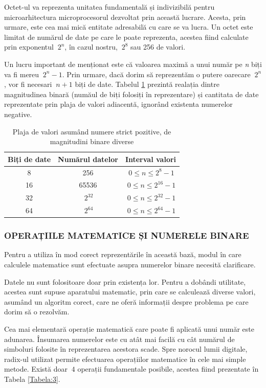 \documentclass[12pt]{article}
\begin{document}
Octet-ul va reprezenta unitatea fundamentală și indivizibilă pentru microarhitectura microprocesorul dezvoltat prin această lucrare. Acesta, prin urmare, este cea mai mică entitate adresabilă cu care se va lucra. Un octet este limitat de numărul de date pe care le poate reprezenta, acestea fiind calculate prin exponentul $\ 2^n$, în cazul nostru, $\ 2^8$ sau 256 de valori.

Un lucru important de menționat este că valoarea maximă a unui număr pe \textit{n} biți va fi mereu $\ 2^n -1$. Prin urmare, dacă dorim să reprezentăm o putere oarecare $\ 2^n$, vor fi necesari $\ n +1$ biți de date.
Tabelul \ref{Tabela:2} prezintă realația dintre magnitudinea binară (număul de biți folosiți în reprezentare) și cantitata de date reprezentate prin plaja de valori adiacentă, ignorând existenta numerelor negative.

\begin{table}[h]
\centering
\caption{Plaja de valori asumând numere strict pozitive, de magnitudini binare diverse }
\label{Tabela:2}
\begin{tabular}{ ||c|c|c|| }
 \hline
 Biți de date & Numărul datelor & Interval valori \\ 
 \hline  \hline
 8 & 256 & $\ 0 \le n \le 2^{8} - 1$ \\
 \hline
 16 & 65536 & $\ 0 \le n \le 2^{16} - 1$ \\
 \hline
 32 &  $\ 2^{32}$ & $\ 0 \le n \le 2^{32} - 1$ \\
 \hline
 64 & $\ 2^{64}$ & $\ 0 \le n \le 2^{64} -1$ \\
 \hline
\end{tabular}
\end{table}

\subsubsection{OPERAȚIILE MATEMATICE ȘI NUMERELE BINARE}
Pentru a utiliza în mod corect reprezentările în această bază, modul în care calculele matematice sunt efectuate asupra numerelor binare necesită clarificare.

Datele nu sunt folositoare doar prin existența lor. Pentru a dobândi utilitate, acestea sunt supuse aparatului matematic, prin care se calculează diverse valori, asumând un algoritm corect, care ne oferă informații despre problema pe care dorim să o rezolvăm.

Cea mai elementară operație matematică care poate fi aplicată unui număr este adunarea. Însumarea numerelor este cu atât mai facilă cu cât numărul de simboluri folosite în reprezentarea acestora scade. Spre norocul lumii digitale, radix-ul utilizat permite efectuarea operațiilor matematice în cele mai simple metode. Există doar $\ 4$ operații fundamentale posibile, acestea fiind prezentate în Tabela \ref{Tabela:3}.
\end{document}

